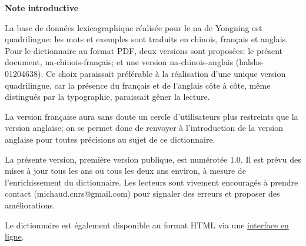 	{\LARGE \textbf{Note introductive}}
	
La base de données lexicographique réalisée pour le na de Yongning est quadrilingue: les mots et exemples sont traduits en chinois, français et anglais. Pour le dictionnaire au format PDF, deux versions sont proposées: le présent document, na-chinois-français; et une version na-chinois-anglais (halshs-01204638). Ce choix paraissait préférable à la réalisation d'une unique version quadrilingue, car la présence du français et de l'anglais côte à côte, même distingués par la typographie, paraissait gêner la lecture.

La version française aura sans doute un cercle d'utilisateurs plus restreints que la version anglaise; on se permet donc de renvoyer à l'introduction de la version anglaise pour toutes précisions au sujet de ce dictionnaire. 

La présente version, première version publique, est numérotée 1.0. Il est prévu des mises à jour tous les ans ou tous les deux ans environ, à mesure de l'enrichissement du dictionnaire. Les lecteurs sont vivement encouragés à prendre contact (michaud.cnrs@gmail.com) pour signaler des erreurs et proposer des améliorations.

Le dictionnaire est également disponible au format HTML via une \href{http://himalco.huma-num.fr/dictionaries/}{interface en ligne}.



